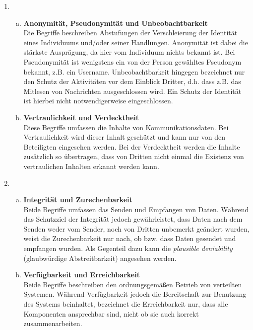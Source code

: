 \documentclass[a4paper,11pt]{scrartcl}
\begin{document}
\begin{enumerate}[1.]
    \item
        \begin{enumerate}[(a)]
            \item \textbf{Anonymität, Pseudonymität und Unbeobachtbarkeit}\\
                  Die Begriffe beschreiben Abstufungen der Verschleierung der
                  Identität eines Individuums und/oder seiner Handlungen.
                  Anonymität ist dabei die stärkste Ausprägung, da hier vom
                  Individuum nichts bekannt ist. Bei Pseudonymität ist wenigstens
                  ein von der Person gewähltes Pseudonym bekannt, z.B. ein
                  Username. Unbeobachtbarkeit hingegen bezeichnet nur den Schutz
                  der Aktivitäten vor dem Einblick Dritter, d.h. dass z.B. das
                  Mitlesen von Nachrichten ausgeschlossen wird. Ein Schutz der
                  Identität ist hierbei nicht notwendigerweise eingeschlossen.
            \item \textbf{Vertraulichkeit und Verdecktheit}\\
                  Diese Begriffe umfassen die Inhalte von Kommunikationsdaten.
                  Bei Vertraulichkeit wird dieser Inhalt geschützt und kann nur
                  von den Beteiligten eingesehen werden. Bei der Verdecktheit
                  werden die Inhalte zusätzlich so übertragen, dass von Dritten
                  nicht einmal die Existenz von vertraulichen Inhalten erkannt
                  werden kann.
        \end{enumerate}

    \item
        \begin{enumerate}[(a)]
            \item \textbf{Integrität und Zurechenbarkeit}\\
                  Beide Begriffe umfassen das Senden und Empfangen von Daten.
                  Während das Schutzziel der Integrität jedoch gewährleistet,
                  dass Daten nach dem Senden weder vom Sender, noch von Dritten
                  unbemerkt geändert wurden, weist die Zurechenbarkeit nur nach,
                  ob bzw. dass Daten gesendet und empfangen wurden. Als Gegenteil
                  dazu kann die \textit{plausible deniability} (glaubwürdige
                  Abstreitbarkeit) angesehen werden.
            \item \textbf{Verfügbarkeit und Erreichbarkeit}\\
                  Beide Begriffe beschreiben den ordnungsgemäßen Betrieb von
                  verteilten Systemen. Während Verfügbarkeit jedoch die Bereitschaft
                  zur Benutzung des Systems beinhaltet, bezeichnet die
                  Erreichbarkeit nur, dass alle Komponenten ansprechbar sind,
                  nicht ob sie auch korrekt zusammenarbeiten.
        \end{enumerate}


\end{enumerate}
\end{document}
